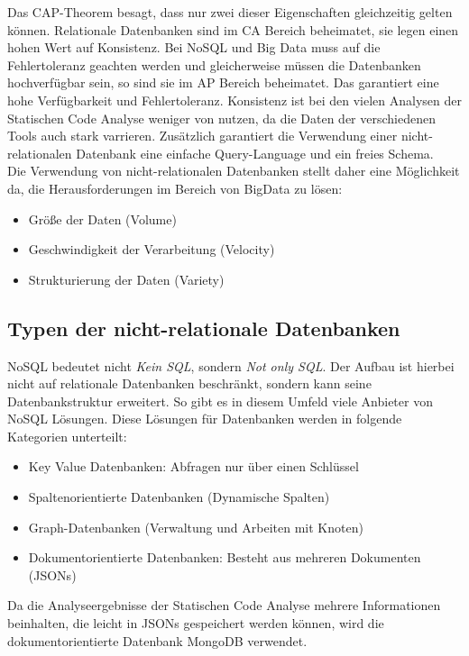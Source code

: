 Das CAP-Theorem besagt, dass nur zwei dieser Eigenschaften gleichzeitig gelten können. 
Relationale Datenbanken sind im CA Bereich beheimatet, sie legen einen hohen Wert auf Konsistenz. Bei NoSQL und Big Data muss  auf die Fehlertoleranz geachten werden und gleicherweise müssen die Datenbanken hochverfügbar sein, so sind sie im AP Bereich beheimatet. Das garantiert eine hohe Verfügbarkeit und Fehlertoleranz. Konsistenz ist bei den vielen Analysen der Statischen Code Analyse weniger von nutzen, da die Daten der verschiedenen Tools auch stark varrieren. Zusätzlich garantiert die Verwendung einer nicht-relationalen Datenbank eine einfache Query-Language und ein freies Schema.\\
Die Verwendung von nicht-relationalen Datenbanken stellt daher eine Möglichkeit da, die Herausforderungen im Bereich von BigData zu lösen:
\begin{itemize}
\item Größe der Daten (Volume) 
\item Geschwindigkeit der Verarbeitung (Velocity)
\item Strukturierung der Daten (Variety)
\end{itemize}


\subsection{Typen der nicht-relationale Datenbanken}
NoSQL bedeutet nicht \emph{Kein SQL}, sondern \emph{Not only SQL}. Der Aufbau ist hierbei nicht auf relationale Datenbanken beschränkt, sondern kann seine Datenbankstruktur erweitert. 
So gibt es in diesem Umfeld viele Anbieter von NoSQL Lösungen. Diese Lösungen für Datenbanken werden in folgende Kategorien unterteilt:

\begin{itemize}
\item Key Value Datenbanken: Abfragen nur über einen Schlüssel
\item Spaltenorientierte Datenbanken (Dynamische Spalten)
\item Graph-Datenbanken (Verwaltung und Arbeiten mit Knoten)
\item Dokumentorientierte Datenbanken: Besteht aus mehreren Dokumenten (JSONs)
\end{itemize}

Da die Analyseergebnisse der Statischen Code Analyse mehrere Informationen beinhalten, die leicht in JSONs gespeichert werden können, wird die dokumentorientierte Datenbank MongoDB verwendet. 

